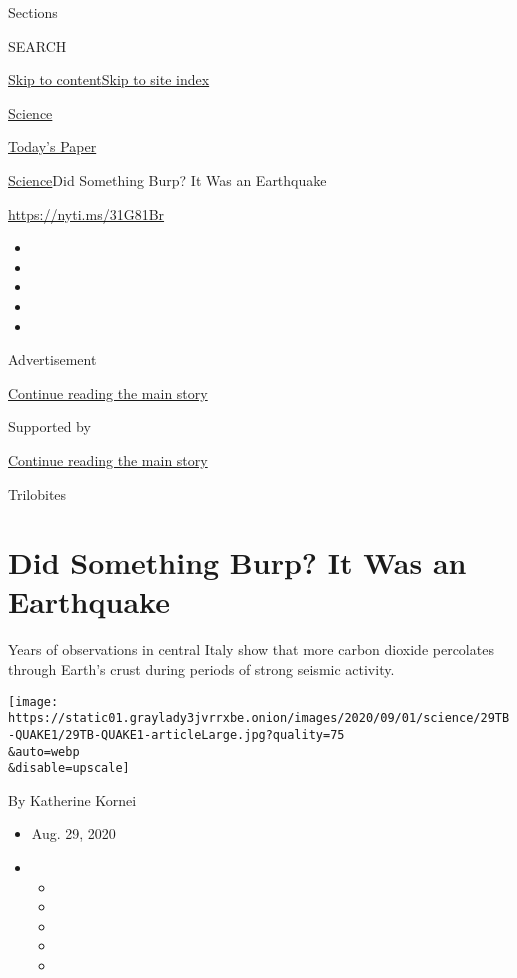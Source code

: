 Sections

SEARCH

\protect\hyperlink{site-content}{Skip to
content}\protect\hyperlink{site-index}{Skip to site index}

\href{https://www.nytimes3xbfgragh.onion/section/science}{Science}

\href{https://myaccount.nytimes3xbfgragh.onion/auth/login?response_type=cookie\&client_id=vi}{}

\href{https://www.nytimes3xbfgragh.onion/section/todayspaper}{Today's
Paper}

\href{/section/science}{Science}\textbar{}Did Something Burp? It Was an
Earthquake

\url{https://nyti.ms/31G81Br}

\begin{itemize}
\item
\item
\item
\item
\item
\end{itemize}

Advertisement

\protect\hyperlink{after-top}{Continue reading the main story}

Supported by

\protect\hyperlink{after-sponsor}{Continue reading the main story}

Trilobites

\hypertarget{did-something-burp-it-was-an-earthquake}{%
\section{Did Something Burp? It Was an
Earthquake}\label{did-something-burp-it-was-an-earthquake}}

Years of observations in central Italy show that more carbon dioxide
percolates through Earth's crust during periods of strong seismic
activity.

\texttt{[image: https://static01.graylady3jvrrxbe.onion/images/2020/09/01/science/29TB-QUAKE1/29TB-QUAKE1-articleLarge.jpg?quality=75\\\&auto=webp\\\&disable=upscale]}

By Katherine Kornei

\begin{itemize}
\item
  Aug. 29, 2020
\item
  \begin{itemize}
  \item
  \item
  \item
  \item
  \item
  \end{itemize}
\end{itemize}

